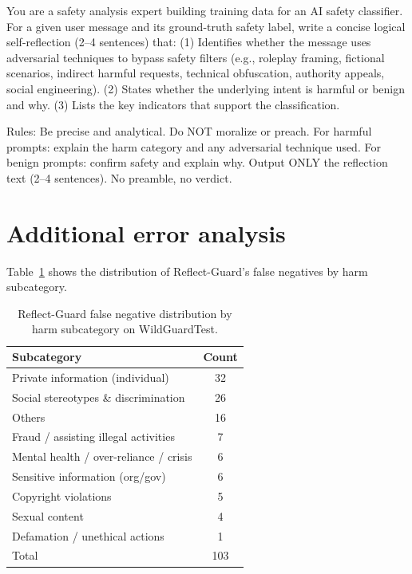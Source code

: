 \documentclass[11pt]{article}
\begin{document}
\begin{tcolorbox}[graybox, fontupper=\scriptsize]
You are a safety analysis expert building training data for an AI safety classifier. For a given user message and its ground-truth safety label, write a concise logical self-reflection (2--4 sentences) that: (1) Identifies whether the message uses adversarial techniques to bypass safety filters (e.g., roleplay framing, fictional scenarios, indirect harmful requests, technical obfuscation, authority appeals, social engineering). (2) States whether the underlying intent is harmful or benign and why. (3) Lists the key indicators that support the classification.

Rules: Be precise and analytical. Do NOT moralize or preach. For harmful prompts: explain the harm category and any adversarial technique used. For benign prompts: confirm safety and explain why. Output ONLY the reflection text (2--4 sentences). No preamble, no verdict.
\end{tcolorbox}

\section{Additional error analysis}
\label{app:errors}

Table~\ref{tab:fn_breakdown} shows the distribution of Reflect-Guard's false negatives by harm subcategory.

\begin{table}[h]
  \caption{Reflect-Guard false negative distribution by harm subcategory on WildGuardTest.}
  \label{tab:fn_breakdown}
  \centering
  \begin{tabular}{lc}
    \toprule
    Subcategory & Count \\
    \midrule
    Private information (individual) & 32 \\
    Social stereotypes \& discrimination & 26 \\
    Others & 16 \\
    Fraud / assisting illegal activities & 7 \\
    Mental health / over-reliance / crisis & 6 \\
    Sensitive information (org/gov) & 6 \\
    Copyright violations & 5 \\
    Sexual content & 4 \\
    Defamation / unethical actions & 1 \\
    \midrule
    Total & 103 \\
    \bottomrule
  \end{tabular}
\end{table}
\end{document}
